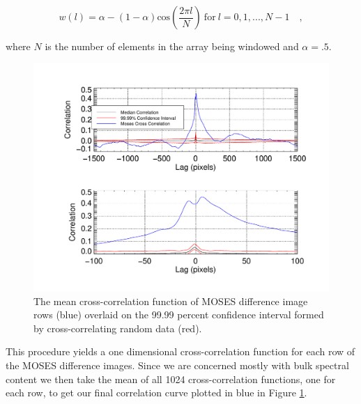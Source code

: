 \documentclass[]{solarphysics}
\begin{document}
\begin{article}
		\begin{equation}
			w(l) = \alpha - (1-\alpha)\mathrm{cos}\left( \frac{2\pi l}{N} \right) \ \mathrm{for} \ l = 0,1,...,N-1 \quad ,
			\label{eqn:Hanning}
		\end{equation}



	where $N$ is the number of elements in the array being windowed and $\alpha = .5$.
 	
 	
 	
			 	
		\begin{figure}
		\centering
		\includegraphics[width=\linewidth]{images/sigtest_5}
		\caption{The mean cross-correlation function of MOSES difference image rows (blue) overlaid on the 99.99 percent confidence interval formed by cross-correlating random data (red). }
		\label{fig:sigtest}
		\end{figure}
 	
	 This procedure yields a one dimensional cross-correlation function for each row of the MOSES difference images.  Since we are concerned mostly with bulk spectral content we then take the mean of all 1024 cross-correlation functions, one for each row, to get our final correlation curve plotted in blue in Figure \ref{fig:sigtest}. 
	 

\end{article}
\end{document}
